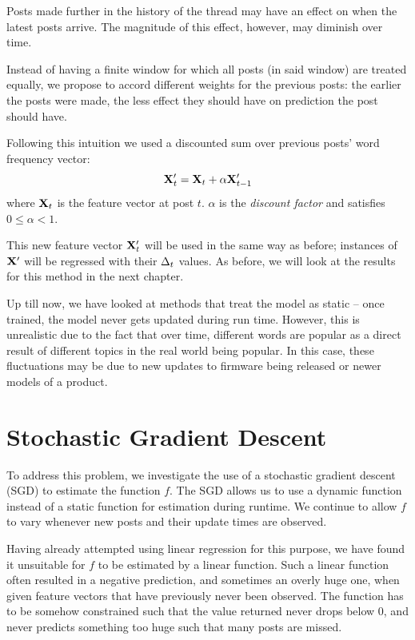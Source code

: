 Posts made further in the history of the thread may have an effect on when the 
latest posts arrive. The magnitude of this effect, however, may diminish over 
time.

Instead of having a finite window for which all posts (in said window) are 
treated equally, we propose to accord different weights for the previous posts: the earlier the posts were made, the less effect they should have on prediction 
the post should have.

Following this intuition we used a discounted sum over previous posts' word 
frequency vector:
\[
	\mathbf{X}'_t = \mathbf{X}_t + \alpha \mathbf{X}'_{t-1}
\]
where $\mathbf{X}_t$ is the feature vector at post $t$. $\alpha$ is the \emph{discount 
factor} and satisfies $0 \leq \alpha < 1$.

This new feature vector $\mathbf{X}'_t$ will be used in the same way as before; 
instances of $\mathbf{X}'$ will be regressed with their $\Delta_t$ values. As before, we will 
look at the results for this method in the next chapter.

Up till now, we have looked at methods that treat the model as static -- once 
trained, the model never gets updated during run time. However, this is 
unrealistic due to the fact that over time, different words are popular as a 
direct result of different topics in the real world being popular. In this case, 
these fluctuations may be due to new updates to firmware being released or newer 
models of a product.

\section{Stochastic Gradient Descent}
To address this problem, we investigate the use of a stochastic gradient descent (SGD) to estimate the function $f$.  The SGD allows us to use a dynamic function instead of a static function for estimation 
during runtime.  We continue to allow $f$ to 
vary whenever new posts and their update times are observed.

Having already attempted using linear regression for this purpose, we have found 
it unsuitable for $f$ to be estimated by a linear function. Such a linear 
function often resulted in a negative prediction, and sometimes an 
overly huge one, when given feature vectors that have previously never been 
observed. The function has to be somehow constrained such that the value 
returned never drops below 0, and never predicts something too huge such that 
many posts are missed.

